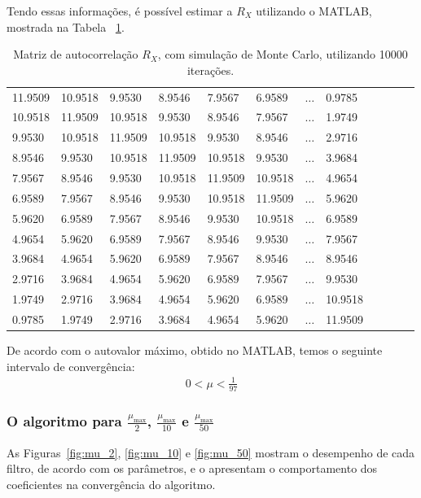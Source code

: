 Tendo essas informações, é possível estimar a $R_X$ utilizando o MATLAB, mostrada na Tabela ~\ref{tab:rxx}.
\begin{table}[!htb]
    \centering
    \begin{tabular}{llllllllllll}
    11.9509 & 10.9518 & 9.9530  & 8.9546  & 7.9567  & 6.9589  & $\dots$ & 0.9785  \\
    10.9518 & 11.9509 & 10.9518 & 9.9530  & 8.9546  & 7.9567  & $\dots$ & 1.9749  \\
    9.9530  & 10.9518 & 11.9509 & 10.9518 & 9.9530  & 8.9546  & $\dots$ & 2.9716  \\
    8.9546  & 9.9530  & 10.9518 & 11.9509 & 10.9518 & 9.9530  & $\dots$ & 3.9684  \\
    7.9567  & 8.9546  & 9.9530  & 10.9518 & 11.9509 & 10.9518 & $\dots$ & 4.9654  \\
    6.9589  & 7.9567  & 8.9546  & 9.9530  & 10.9518 & 11.9509 & $\dots$ & 5.9620  \\
    5.9620  & 6.9589  & 7.9567  & 8.9546  & 9.9530  & 10.9518 & $\dots$ & 6.9589  \\
    4.9654  & 5.9620  & 6.9589  & 7.9567  & 8.9546  & 9.9530  & $\dots$ & 7.9567  \\
    3.9684  & 4.9654  & 5.9620  & 6.9589  & 7.9567  & 8.9546  & $\dots$ & 8.9546  \\
    2.9716  & 3.9684  & 4.9654  & 5.9620  & 6.9589  & 7.9567  & $\dots$ & 9.9530  \\
    1.9749  & 2.9716  & 3.9684  & 4.9654  & 5.9620  & 6.9589  & $\dots$ & 10.9518 \\
    0.9785  & 1.9749  & 2.9716  & 3.9684  & 4.9654  & 5.9620  & $\dots$ & 11.9509
    \end{tabular}
    \caption{Matriz de autocorrelação $R_X$, com simulação de Monte Carlo, utilizando 10000 iterações.}
    \label{tab:rxx}
\end{table}

De acordo com o autovalor máximo, obtido no MATLAB, temos o seguinte intervalo de convergência:
\begin{align*}
    0 < \mu < \frac{1}{97}
\end{align*}

\subsubsection*{O algoritmo para $\frac{\mu_{\text{max}}}{2}$, $\frac{\mu_{\text{max}}}{10}$ e $\frac{\mu_{\text{max}}}{50}$} 


As Figuras~\ref{fig:mu_2}, \ref{fig:mu_10} e \ref{fig:mu_50} mostram o desempenho de cada filtro, de acordo com os parâmetros, e o apresentam o comportamento dos coeficientes na convergência do algoritmo. 

